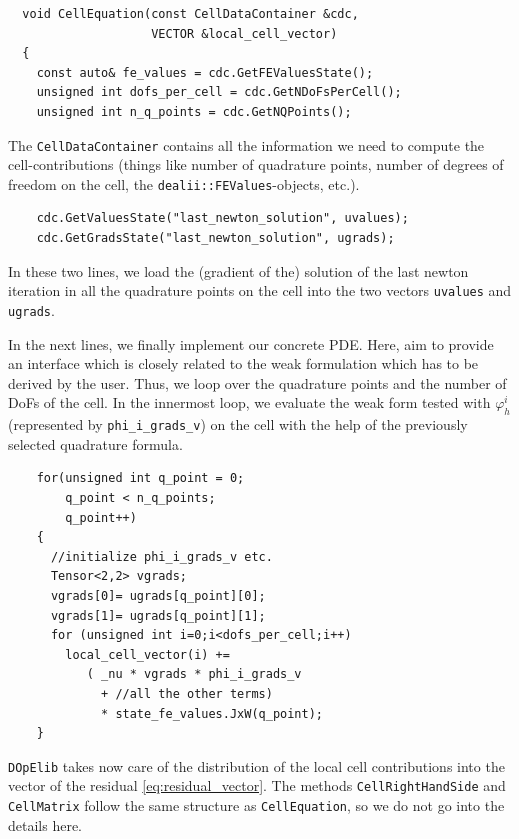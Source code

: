 \documentclass[smallextended]{svjour3}       %
\numberwithin{equation}{section}
\renewcommand{\phi}{\varphi}
\newcommand{\dope}{\texttt{DOpElib}}
\begin{document}
\begin{lstlisting}
  void CellEquation(const CellDataContainer &cdc,
                    VECTOR &local_cell_vector)
  {
    const auto& fe_values = cdc.GetFEValuesState();
    unsigned int dofs_per_cell = cdc.GetNDoFsPerCell();
    unsigned int n_q_points = cdc.GetNQPoints();
\end{lstlisting}
 The \texttt{CellDataContainer} contains all the information we need to compute the cell-contributions (things like number of quadrature points, number of degrees of freedom on the cell, the \texttt{dealii::FEValues}-objects, etc.).
  \begin{lstlisting}
    cdc.GetValuesState("last_newton_solution", uvalues);
    cdc.GetGradsState("last_newton_solution", ugrads);
 \end{lstlisting}
 In these two lines, we load the (gradient of the) solution of the last newton iteration in all the quadrature points on the cell into the two vectors \texttt{uvalues} and \texttt{ugrads}.

In the next lines, we finally implement our concrete PDE. Here, aim to provide 
an interface which is closely related to the weak formulation which 
has to be derived by the user. Thus,
we loop over the quadrature points and the number of DoFs of the cell. In the innermost loop, we evaluate the weak form tested with $\phi_{h}^i$ (represented by \texttt{phi\_i\_grads\_v}) on the cell with the help of the previously selected quadrature formula. 
 \begin{lstlisting}
    for(unsigned int q_point = 0; 
        q_point < n_q_points; 
        q_point++)
    {
      //initialize phi_i_grads_v etc.
      Tensor<2,2> vgrads;
      vgrads[0]= ugrads[q_point][0]; 
      vgrads[1]= ugrads[q_point][1];
      for (unsigned int i=0;i<dofs_per_cell;i++)
        local_cell_vector(i) += 
           ( _nu * vgrads * phi_i_grads_v 
             + //all the other terms)
             * state_fe_values.JxW(q_point);
    }
\end{lstlisting}
\dope{} takes now care of the distribution of the local cell contributions into  the vector of the residual \eqref{eq:residual_vector}. The methods \texttt{CellRightHandSide} and \texttt{CellMatrix} follow the same structure as 
\texttt{CellEquation}, so we do not go into the details here.
\end{document}
